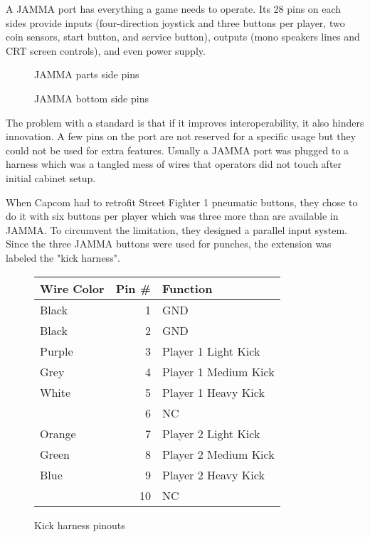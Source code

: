 A JAMMA port has everything a game needs to operate. Its 28 pins on each sides provide inputs (four-direction joystick and three buttons per player, two coin sensors, start button, and service button), outputs (mono speakers lines and CRT screen controls), and even power supply.

 \begin{figure}[H]
\caption*{JAMMA parts side pins}
\end{figure}

 \begin{figure}[H]
\caption*{JAMMA bottom side pins}
\end{figure}

The problem with a standard is that if it improves interoperability, it also hinders innovation. A few pins on the port are not reserved for a specific usage but they could not be used for extra features. Usually a JAMMA port was plugged to a harness which was a tangled mess of wires that operators did not touch after initial cabinet setup.

When Capcom had to retrofit Street Fighter 1 pneumatic buttons, they chose to do it with six buttons per player which was three more than are available in JAMMA. To circumvent the limitation, they designed a parallel input system. Since the three JAMMA buttons were used for punches, the extension was labeled the "kick harness".

\begin{figure}[H]

\begin{tabularx}{\textwidth}{lrX}
  \toprule    
  \textbf{Wire Color } & \textbf{ Pin \#}  & \textbf{Function } \\               
  \toprule   
  Black & 1 & GND \\
  Black & 2 & GND \\
  \toprule   
  Purple & 3 & Player 1 Light Kick \\
  Grey & 4 & Player 1 Medium Kick \\
  White & 5 & Player 1 Heavy Kick \\
  \toprule   
  & 6 & NC \\
  \toprule   
  Orange & 7 & Player 2 Light Kick\\
  Green & 8 & Player 2 Medium Kick\\
  Blue & 9 & Player 2 Heavy Kick\\
  \toprule   
  & 10 & NC \\
  \toprule   
\end{tabularx}
\caption*{Kick harness pinouts}
\end{figure}










